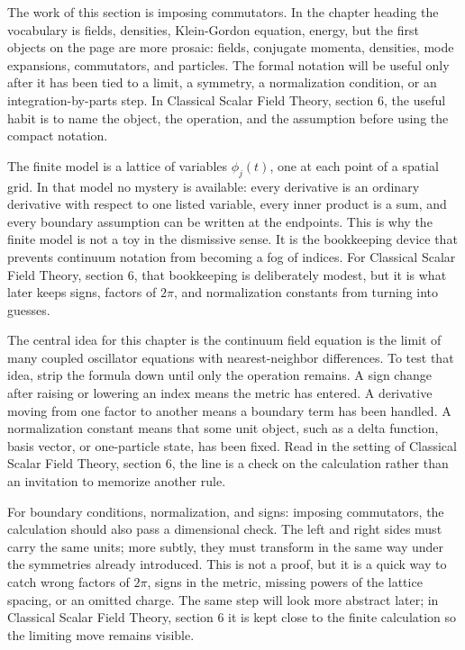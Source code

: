 The work of this section is imposing commutators.  In the chapter heading the vocabulary is fields, densities, Klein-Gordon equation, energy, but the first objects on the page are more prosaic: fields, conjugate momenta, densities, mode expansions, commutators, and particles.  The formal notation will be useful only after it has been tied to a limit, a symmetry, a normalization condition, or an integration-by-parts step.  In Classical Scalar Field Theory, section 6, the useful habit is to name the object, the operation, and the assumption before using the compact notation.

The finite model is a lattice of variables \(\phi_j(t)\), one at each point of a spatial grid.  In that model no mystery is available: every derivative is an ordinary derivative with respect to one listed variable, every inner product is a sum, and every boundary assumption can be written at the endpoints.  This is why the finite model is not a toy in the dismissive sense.  It is the bookkeeping device that prevents continuum notation from becoming a fog of indices.  For Classical Scalar Field Theory, section 6, that bookkeeping is deliberately modest, but it is what later keeps signs, factors of \(2\pi\), and normalization constants from turning into guesses.

The central idea for this chapter is the continuum field equation is the limit of many coupled oscillator equations with nearest-neighbor differences.  To test that idea, strip the formula down until only the operation remains.  A sign change after raising or lowering an index means the metric has entered.  A derivative moving from one factor to another means a boundary term has been handled.  A normalization constant means that some unit object, such as a delta function, basis vector, or one-particle state, has been fixed.  Read in the setting of Classical Scalar Field Theory, section 6, the line is a check on the calculation rather than an invitation to memorize another rule.

For boundary conditions, normalization, and signs: imposing commutators, the calculation should also pass a dimensional check.  The left and right sides must carry the same units; more subtly, they must transform in the same way under the symmetries already introduced.  This is not a proof, but it is a quick way to catch wrong factors of \(2\pi\), signs in the metric, missing powers of the lattice spacing, or an omitted charge.  The same step will look more abstract later; in Classical Scalar Field Theory, section 6 it is kept close to the finite calculation so the limiting move remains visible.

